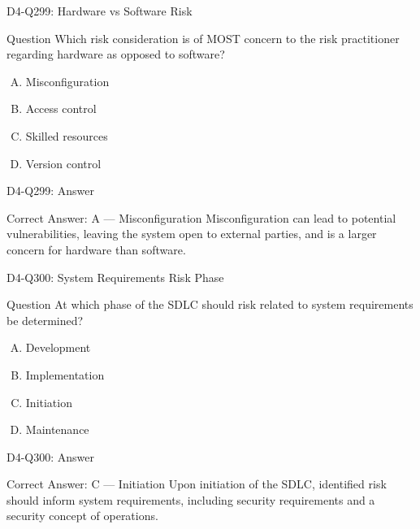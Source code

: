 \documentclass{beamer}
\begin{document}
	\begin{frame}{D4-Q299: Hardware vs Software Risk}
		\begin{block}{Question}
			Which risk consideration is of MOST concern to the risk practitioner regarding hardware as opposed to software?
		\end{block}
		\begin{enumerate}[(A)]
			\item Misconfiguration
			\item Access control
			\item Skilled resources
			\item Version control
		\end{enumerate}
	\end{frame}
	\begin{frame}{D4-Q299: Answer}
		\begin{block}{Correct Answer: A --- Misconfiguration}
			Misconfiguration can lead to potential vulnerabilities, leaving the system open to external parties, and is a larger concern for hardware than software.
		\end{block}
	\end{frame}
	
	\begin{frame}{D4-Q300: System Requirements Risk Phase}
		\begin{block}{Question}
			At which phase of the SDLC should risk related to system requirements be determined?
		\end{block}
		\begin{enumerate}[(A)]
			\item Development
			\item Implementation
			\item Initiation
			\item Maintenance
		\end{enumerate}
	\end{frame}
	\begin{frame}{D4-Q300: Answer}
		\begin{block}{Correct Answer: C --- Initiation}
			Upon initiation of the SDLC, identified risk should inform system requirements, including security requirements and a security concept of operations.
		\end{block}
	\end{frame}
	
\end{document}

